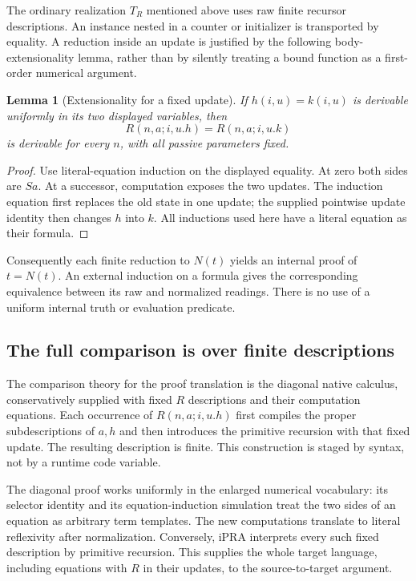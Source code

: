 \documentclass[11pt]{article}
\newtheorem{lemma}[theorem]{Lemma}
\theoremstyle{definition}\newtheorem{definition}[theorem]{Definition}
\theoremstyle{remark}\newtheorem{remark}[theorem]{Remark}
\begin{document}
The ordinary realization $T_R$ mentioned above uses raw finite recursor
descriptions. An instance nested in a counter or initializer is transported
by equality. A reduction inside an update is justified by the following
body-extensionality lemma, rather than by silently treating a bound
function as a first-order numerical argument.

\begin{lemma}[Extensionality for a fixed update]
If $h(i,u)=k(i,u)$ is derivable uniformly in its two displayed variables,
then
\[
 R(n,a;i,u.h)=R(n,a;i,u.k)
\]
is derivable for every $n$, with all passive parameters fixed.
\end{lemma}
\begin{proof}
Use literal-equation induction on the displayed equality. At zero both
sides are $Sa$. At a successor, computation exposes the two updates.
The induction equation first replaces the old state in one update;
the supplied pointwise update identity then changes $h$ into $k$.
All inductions used here have a literal equation as their formula.
\end{proof}

Consequently each finite reduction to $N(t)$ yields an internal proof
of $t=N(t)$. An external induction on a formula gives the corresponding
equivalence between its raw and normalized readings. There is no use
of a uniform internal truth or evaluation predicate.

\subsection{The full comparison is over finite descriptions}

The comparison theory for the proof translation is the diagonal native
calculus, conservatively supplied with fixed $R$ descriptions and their
computation equations. Each occurrence of $R(n,a;i,u.h)$ first compiles
the proper subdescriptions of $a,h$ and then introduces the primitive
recursion with that fixed update. The resulting description is finite.
This construction is staged by syntax, not by a runtime code variable.

The diagonal proof works uniformly in the enlarged numerical vocabulary:
its selector identity and its equation-induction simulation treat the two
sides of an equation as arbitrary term templates. The new computations
translate to literal reflexivity after normalization. Conversely, iPRA
interprets every such fixed description by primitive recursion. This
supplies the whole target language, including equations with $R$ in their
updates, to the source-to-target argument.
\end{document}
